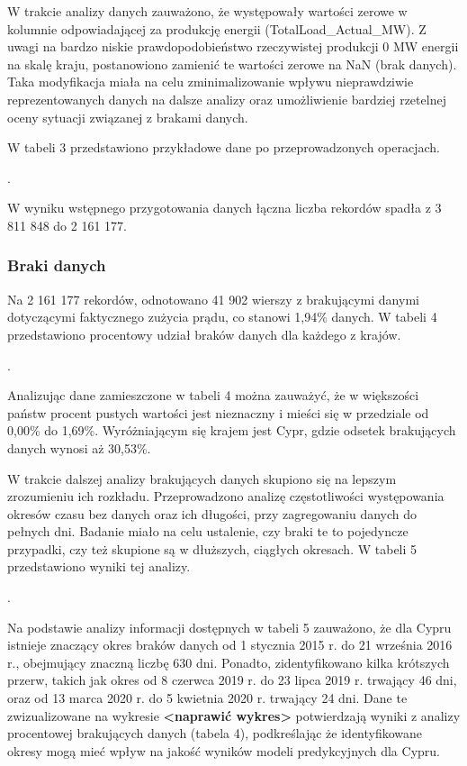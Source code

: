 \documentclass[polish, twoside, 12pt, a4paper]{article}
\theoremstyle{definition}
\theoremstyle{plain}
\theoremstyle{remark}
\begin{document}
W trakcie analizy danych zauważono, że występowały wartości zerowe w kolumnie odpowiadającej za produkcję energii (TotalLoad\_Actual\_MW). Z uwagi na bardzo niskie prawdopodobieństwo rzeczywistej produkcji 0 MW energii na skalę kraju, postanowiono zamienić te wartości zerowe na NaN (brak danych). Taka modyfikacja miała na celu zminimalizowanie wpływu nieprawdziwie reprezentowanych danych na dalsze analizy oraz umożliwienie bardziej rzetelnej oceny sytuacji związanej z brakami danych.

W tabeli 3 przedstawiono przykładowe dane po przeprowadzonych operacjach.

. 

W wyniku wstępnego przygotowania danych łączna liczba rekordów spadła z 3 811 848 do 2 161 177.

\subsubsection{Braki danych}

Na 2 161 177 rekordów, odnotowano 41 902 wierszy z brakującymi danymi dotyczącymi faktycznego zużycia prądu, co stanowi 1,94\% danych. W tabeli 4 przedstawiono procentowy udział braków danych dla każdego z krajów. 

. 

Analizując dane zamieszczone w tabeli 4 można zauważyć, że w większości państw procent pustych wartości jest nieznaczny i mieści się w przedziale od 0,00\% do 1,69\%. Wyróżniającym się krajem jest Cypr, gdzie odsetek brakujących danych wynosi aż 30,53\%.

W trakcie dalszej analizy brakujących danych skupiono się na lepszym zrozumieniu ich rozkładu. Przeprowadzono analizę częstotliwości występowania okresów czasu bez danych oraz ich długości, przy zagregowaniu danych do pełnych dni. Badanie miało na celu ustalenie, czy braki te to pojedyncze przypadki, czy też skupione są w dłuższych, ciągłych okresach. W tabeli 5 przedstawiono wyniki tej analizy. 

. 

Na podstawie analizy informacji dostępnych w tabeli 5 zauważono, że dla Cypru istnieje znaczący okres braków danych od 1 stycznia 2015 r. do 21 września 2016 r., obejmujący znaczną liczbę 630 dni. Ponadto, zidentyfikowano kilka krótszych przerw, takich jak okres od 8 czerwca 2019 r. do 23 lipca 2019 r. trwający 46 dni, oraz od 13 marca 2020 r. do 5 kwietnia 2020 r. trwający 24 dni. Dane te zwizualizowane na wykresie  \textbf{<naprawić wykres>} potwierdzają wyniki z analizy procentowej brakujących danych (tabela 4), podkreślając że identyfikowane okresy mogą mieć wpływ na jakość wyników modeli predykcyjnych dla Cypru.
\end{document}

